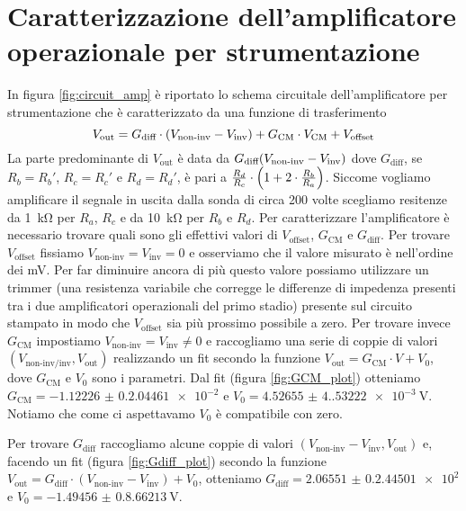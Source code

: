 \documentclass[
    prl,
    reprint, 
    superscriptaddress, 
    altaffilletter, 
    amsmath, 
    amssymb, 
    a4paper,
    varvw]{revtex4-2}
\begin{document}
\section{Caratterizzazione dell'amplificatore operazionale per strumentazione}\label{sec:appendix_strum_opamp}

In figura \ref{fig:circuit_amp} è riportato lo schema circuitale dell'amplificatore per strumentazione che  è caratterizzato da una funzione di trasferimento \begin{equation}
    V_\text{out} = G_\text{diff}\cdot \qty(V_\text{non-inv}-V_\text{inv}) +  G_\text{CM}\cdot V_\text{CM} + V_\text{offset} 
\end{equation}
La parte predominante di $V_\text{out}$ è data da $G_\text{diff}\qty(V_\text{non-inv}-V_\text{inv})$ dove $G_\text{diff}$, se $R_b=R_b'$, $R_c=R_c'$ e $R_d=R_d'$, è pari a $\frac{R_{d}}{R_{c}}\cdot \qty(1+2\cdot \frac{R_{b}}{R_{a}})$. Siccome vogliamo amplificare il segnale in uscita dalla sonda di circa 200 volte scegliamo resitenze da \SI{1}{\kilo\ohm} per $R_a$, $R_c$ e da \SI{10}{\kilo\ohm} per $R_b$ e $R_d$. Per caratterizzare l'amplificatore è necessario trovare quali sono gli effettivi valori di $V_\text{offset}$, $G_\text{CM}$ e $G_\text{diff}$. 
Per trovare $V_\text{offset}$ fissiamo $V_\text{non-inv}=V_\text{inv}=0$ e osserviamo che il valore misurato è nell'ordine dei \si{\milli\volt}. Per far diminuire ancora di più questo valore possiamo utilizzare un trimmer (una resistenza variabile che corregge le differenze di impedenza presenti tra i due amplificatori operazionali del primo stadio) presente sul circuito stampato in modo che $V_\text{offset}$ sia più prossimo possibile a zero.
Per trovare invece $G_\text{CM}$ impostiamo $V_\text{non-inv}=V_\text{inv}\neq 0$ e raccogliamo una serie di coppie di valori $(V_\text{non-inv/inv},V_\text{out})$ realizzando un fit secondo la funzione $V_\text{out}=G_\text{CM}\cdot V+V_0$, dove $G_\text{CM}$ e $V_0$ sono i parametri. Dal fit (figura \ref{fig:GCM_plot}) otteniamo $G_\text{CM} = \num{-1.12226(0.204461)e-2}$ e $V_0 = \SI{4.52655(4.53222)e-3}{\volt}$. Notiamo che come ci aspettavamo $V_0$ è compatibile con zero.

Per trovare $G_\text{diff}$  raccogliamo alcune coppie di valori $(V_\text{non-inv}-V_\text{inv},V_\text{out})$ e, facendo un fit (figura \ref{fig:Gdiff_plot}) secondo la funzione $V_\text{out}=G_\text{diff}\cdot (V_\text{non-inv}-V_\text{inv})+V_0$, otteniamo $G_\text{diff} = \num{2.06551(0.244501)e2}$ e $V_0 = \SI{-1.49456(0.866213)}{\volt}$.
\end{document}

